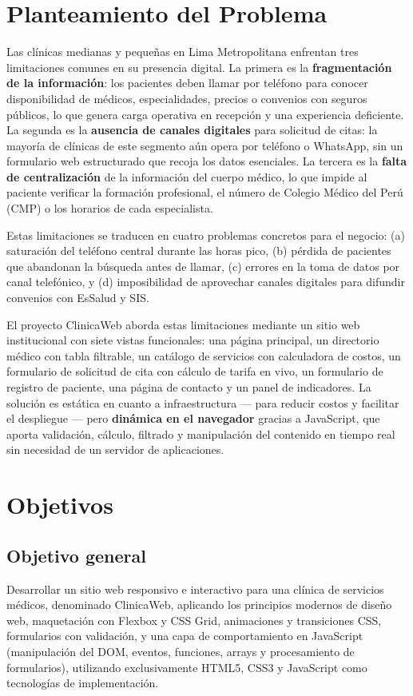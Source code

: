 \documentclass[11pt,a4paper]{article}
\begin{document}
\section{Planteamiento del Problema}

Las clínicas medianas y pequeñas en Lima Metropolitana enfrentan tres limitaciones comunes en su presencia digital. La primera es la \textbf{fragmentación de la información}: los pacientes deben llamar por teléfono para conocer disponibilidad de médicos, especialidades, precios o convenios con seguros públicos, lo que genera carga operativa en recepción y una experiencia deficiente. La segunda es la \textbf{ausencia de canales digitales} para solicitud de citas: la mayoría de clínicas de este segmento aún opera por teléfono o WhatsApp, sin un formulario web estructurado que recoja los datos esenciales. La tercera es la \textbf{falta de centralización} de la información del cuerpo médico, lo que impide al paciente verificar la formación profesional, el número de Colegio Médico del Perú (CMP) o los horarios de cada especialista.

Estas limitaciones se traducen en cuatro problemas concretos para el negocio: (a) saturación del teléfono central durante las horas pico, (b) pérdida de pacientes que abandonan la búsqueda antes de llamar, (c) errores en la toma de datos por canal telefónico, y (d) imposibilidad de aprovechar canales digitales para difundir convenios con EsSalud y SIS.

El proyecto ClinicaWeb aborda estas limitaciones mediante un sitio web institucional con siete vistas funcionales: una página principal, un directorio médico con tabla filtrable, un catálogo de servicios con calculadora de costos, un formulario de solicitud de cita con cálculo de tarifa en vivo, un formulario de registro de paciente, una página de contacto y un panel de indicadores. La solución es estática en cuanto a infraestructura --- para reducir costos y facilitar el despliegue --- pero \textbf{dinámica en el navegador} gracias a JavaScript, que aporta validación, cálculo, filtrado y manipulación del contenido en tiempo real sin necesidad de un servidor de aplicaciones.

\section{Objetivos}

\subsection{Objetivo general}
Desarrollar un sitio web responsivo e interactivo para una clínica de servicios médicos, denominado ClinicaWeb, aplicando los principios modernos de diseño web, maquetación con Flexbox y CSS Grid, animaciones y transiciones CSS, formularios con validación, y una capa de comportamiento en JavaScript (manipulación del DOM, eventos, funciones, arrays y procesamiento de formularios), utilizando exclusivamente HTML5, CSS3 y JavaScript como tecnologías de implementación.
\end{document}
